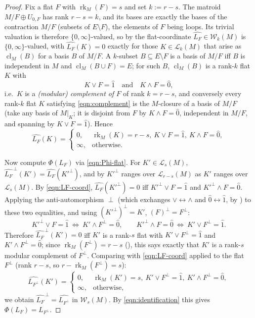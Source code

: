 \documentclass{article}
\theoremstyle{definition}
\newcommand{\rk}{\operatorname{rk}}
\newcommand{\cl}{\operatorname{cl}}
\newcommand{\cLL}{\mathcal{L}}
\newcommand{\cW}{\mathcal{W}}
\begin{document}
\begin{proof}
Fix a flat $F$ with $\rk_M(F)=s$ and set $k:=r-s$. The matroid $M/F\oplus U_{0,F}$ has rank $r-s=k$,
and its bases are exactly the bases of the contraction $M/F$ (subsets of $E\setminus F$), the
elements of $F$ being loops. Its trivial valuation is therefore $\{0,\infty\}$-valued, so by
 the flat-coordinate $\widehat{L_F}\in\cW_{k}(M)$ is $\{0,\infty\}$-valued, with
$\widehat{L_F}(K)=0$ exactly for those $K\in\cLL_{k}(M)$ that arise as $\cl_M(B)$ for a basis $B$ of
$M/F$. A $k$-subset $B\subseteq E\setminus F$ is a basis of $M/F$ iff $B$ is independent in $M$ and
$\cl_M(B\cup F)=E$; for such $B$, $\cl_M(B)$ is a rank-$k$ flat $K$ with
\begin{equation}\label{eqn:complement}
  K\vee F=\hat1\quad\text{and}\quad K\wedge F=\hat0 ,
\end{equation}
i.e.\ $K$ is a \emph{(modular) complement of $F$} of rank $k=r-s$, and conversely every rank-$k$
flat $K$ satisfying \eqref{eqn:complement} is the $M$-closure of a basis of $M/F$ (take any basis of
$M|_K$; it is disjoint from $F$ by $K\wedge F=\hat0$, independent in $M/F$, and spanning by $K\vee
F=\hat1$). Hence
\begin{equation}\label{eqn:LF-coord}
  \widehat{L_F}(K)=\begin{cases}0,& \rk_M(K)=r-s,\ K\vee F=\hat1,\ K\wedge F=\hat0,\\
  \infty,&\text{otherwise.}\end{cases}
\end{equation}

Now compute $\Phi(L_F)$ via \eqref{eqn:Phi-flat}. For $K'\in\cLL_{s}(M)$,
$\widehat{L_F}^{\,\perp}(K')=\widehat{L_F}(K'^{\perp})$, and by  $K'^{\perp}$ ranges
over $\cLL_{r-s}(M)$ as $K'$ ranges over $\cLL_{s}(M)$. By \eqref{eqn:LF-coord},
$\widehat{L_F}(K'^{\perp})=0$ iff $K'^{\perp}\vee F=\hat1$ and $K'^{\perp}\wedge F=\hat0$. Applying
the anti-automorphism $\perp$ (which exchanges $\vee\leftrightarrow\wedge$ and
$\hat0\leftrightarrow\hat1$, by ) to these two equalities, and using
$(K'^{\perp})^{\perp}=K'$, $(F)^{\perp}=F^{\perp}$:
\[
  K'^{\perp}\vee F=\hat1\ \Longleftrightarrow\ K'\wedge F^{\perp}=\hat0,\qquad
  K'^{\perp}\wedge F=\hat0\ \Longleftrightarrow\ K'\vee F^{\perp}=\hat1 .
\]
Therefore $\widehat{L_F}^{\,\perp}(K')=0$ iff $K'$ is a rank-$s$ flat with $K'\vee F^{\perp}=\hat1$
and $K'\wedge F^{\perp}=\hat0$; since $\rk_M(F^{\perp})=r-s$ (), this says exactly
that $K'$ is a rank-$s$ modular complement of $F^{\perp}$. Comparing with \eqref{eqn:LF-coord}
applied to the flat $F^{\perp}$ (rank $r-s$, so $r-\rk_M(F^{\perp})=s$):
\[
  \widehat{L_{F^{\perp}}}(K')=\begin{cases}0,&\rk_M(K')=s,\ K'\vee F^{\perp}=\hat1,\ K'\wedge
  F^{\perp}=\hat0,\\ \infty,&\text{otherwise,}\end{cases}
\]
we obtain $\widehat{L_F}^{\,\perp}=\widehat{L_{F^{\perp}}}$ in $\cW_{s}(M)$. By
\eqref{eqn:identification} this gives $\Phi(L_F)=L_{F^{\perp}}$.
\end{proof}
\end{document}
